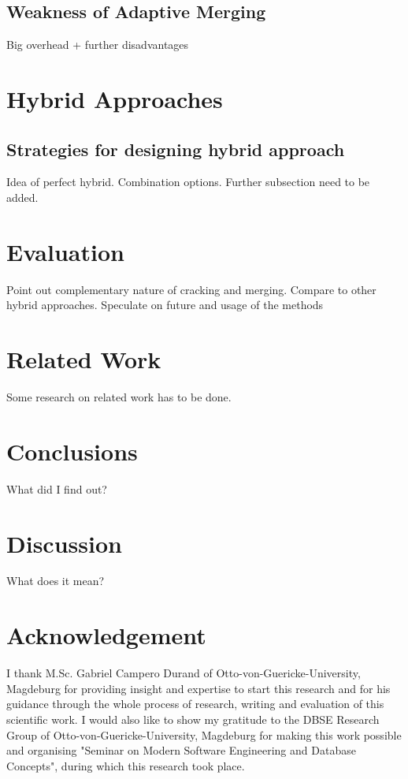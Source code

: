 \documentclass[10pt, conference, compsocconf]{IEEEtran}
\begin{document}
\subsection{Weakness of Adaptive Merging}
Big overhead + further disadvantages

\section{Hybrid Approaches}
\subsection{Strategies for designing hybrid approach}
Idea of perfect hybrid. Combination options. Further subsection need to be added.

\section{Evaluation}
Point out complementary nature of cracking and merging. Compare to other hybrid approaches. Speculate on future and usage of the methods

\section{Related Work}
Some research on related work has to be done.

\section{Conclusions}
What did I find out?

\section{Discussion}
What does it mean?

\section*{Acknowledgement}
I thank M.Sc. Gabriel Campero Durand of Otto-von-Guericke-University, Magdeburg for providing insight and expertise to start this research and for his guidance through the whole process of research, writing and evaluation of this scientific work. I would also like to show my gratitude to the DBSE Research Group of Otto-von-Guericke-University, Magdeburg for making this work possible and organising "Seminar on Modern Software Engineering and Database Concepts", during which this research took place.
\end{document}

